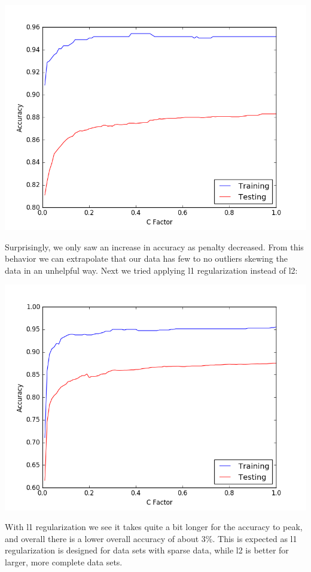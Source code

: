 \documentclass{article} %
\begin{document}
 \includegraphics[scale=.5]{l2_penalty-fixed}


 Surprisingly, we only saw an increase in accuracy as penalty decreased. From
 this behavior we can extrapolate that our data has few to no outliers skewing the
 data in an unhelpful way. Next we tried applying l1 regularization instead of l2:


 \includegraphics[scale=.5]{l1_penalty-fixed}


 With l1 regularization we see it takes quite a bit longer for the accuracy to peak, and
 overall there is a lower overall accuracy of about 3\%. This is expected as l1
 regularization is designed for data sets with sparse data, while l2 is better for larger,
 more complete data sets.
\end{document}
